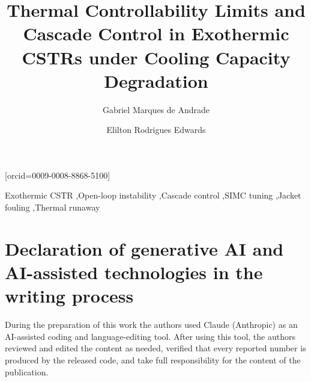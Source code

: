 \documentclass[a4paper,fleqn]{cas-dc}
\begin{document}
\let\WriteBookmarks\relax
\def\floatpagepagefraction{1}
\def\textpagefraction{.001}

\title [mode = title]{Thermal Controllability Limits and Cascade Control in Exothermic CSTRs under Cooling Capacity Degradation}

\author[1]{Gabriel Marques de Andrade}[orcid=0009-0008-8868-5100]
\cormark[1]

\author[1]{Elilton Rodrigues Edwards}







\begin{keywords}
Exothermic CSTR \sep Open-loop instability \sep Cascade control \sep SIMC tuning \sep Jacket fouling \sep Thermal runaway
\end{keywords}

\maketitle








{\raggedright\sloppy\printcredits}

\section*{Declaration of generative AI and AI-assisted technologies in the writing process}
During the preparation of this work the authors used Claude (Anthropic) as an AI-assisted coding and language-editing tool. After using this tool, the authors reviewed and edited the content as needed, verified that every reported number is produced by the released code, and take full responsibility for the content of the publication.
\end{document}
